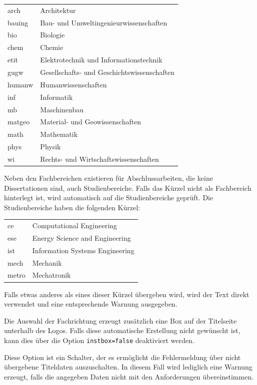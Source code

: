\documentclass[
	ngerman,%
	accentcolor=9c,%
	ruledheaders=section,%
	class=report,%
	thesis={type=bachelor},%
	fontsize=11pt,%
	parskip=half-,%
	custommargins=true,%
	marginpar=false,%
]{tudapub}
\newcommand*{\code}[1]{\texttt{#1}}
\begin{document}
\begin{description}
	      \begin{tabular}{@{}l@{${}\to{}$}l@{}}
		      arch  & Architektur\\
		      bauing& Bau- und Umweltingenieurwissenschaften\\
		      bio   &Biologie\\
		      chem  &Chemie\\
		      etit  &Elektrotechnik und Informationstechnik\\
		      gugw  &Gesellschafts- und Geschichtswissenschaften\\
		      humanw&Humanwissenschaften\\
		      inf   &Informatik\\
		      mb    &Maschinenbau\\
		      matgeo&Material- und Geowissenschaften\\
		      math  &Mathematik\\
		      phys  &Physik\\
		      wi    &Rechts- und Wirtschaftswissenschaften
	      \end{tabular}

	      Neben den Fachbereichen existieren für Abschlussarbeiten, die keine Dissertationen sind, auch Studienbereiche.
	      Falls das Kürzel nicht als Fachbereich hinterlegt ist, wird automatisch auf die Studienbereiche geprüft. Die Studienbereiche haben die folgenden Kürzel:

	      \begin{tabular}{@{}l@{${}\to{}$}l@{}}
		      ce&Computational Engineering\\
		      ese&Energy Science and Engineering\\
		      ist&Information Systems Engineering\\
		      mech&Mechanik\\
		      metro&Mechatronik
	      \end{tabular}

	      Falls etwas anderes als eines dieser Kürzel übergeben wird, wird der Text direkt verwendet und eine entsprechende Warnung ausgegeben.

	      Die Auswahl der Fachrichtung erzeugt zusätzlich eine Box auf der Titelseite unterhalb des Logos. Falls diese automatische Erstellung nicht gewünscht ist, kann dies über die Option \code{instbox=false} deaktiviert werden.
	\item[ignore-missing-data] Diese Option ist ein Schalter, der es ermöglicht die Fehlermeldung über nicht übergebene Titeldaten auszuschalten. In diesem Fall wird lediglich eine Warnung erzeugt, falls die angegeben Daten nicht mit den Anforderungen übereinstimmen.
\end{description}
\end{document}
